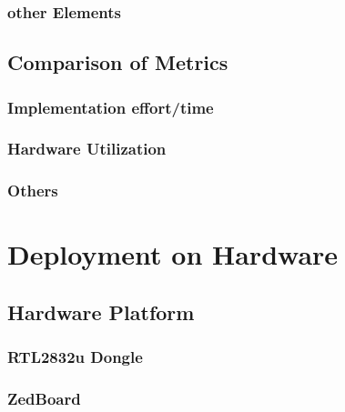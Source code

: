     \subsection{other Elements}

  \section{Comparison of Metrics}
    \subsection{Implementation effort/time}
    \subsection{Hardware Utilization}
    \subsection{Others}


\chapter{Deployment on Hardware}
  \section{Hardware Platform}
    \subsection{RTL2832u Dongle}
    \subsection{ZedBoard}
